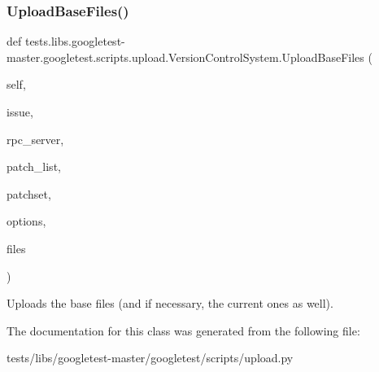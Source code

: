 \subsubsection{\texorpdfstring{Upload\+Base\+Files()}{UploadBaseFiles()}}
{\footnotesize\ttfamily def tests.\+libs.\+googletest-\/master.\+googletest.\+scripts.\+upload.\+Version\+Control\+System.\+Upload\+Base\+Files (\begin{DoxyParamCaption}\item[{}]{self,  }\item[{}]{issue,  }\item[{}]{rpc\+\_\+server,  }\item[{}]{patch\+\_\+list,  }\item[{}]{patchset,  }\item[{}]{options,  }\item[{}]{files }\end{DoxyParamCaption})}

\begin{DoxyVerb}Uploads the base files (and if necessary, the current ones as well).\end{DoxyVerb}
 

The documentation for this class was generated from the following file\+:\begin{DoxyCompactItemize}
\item 
tests/libs/googletest-\/master/googletest/scripts/upload.\+py\end{DoxyCompactItemize}
